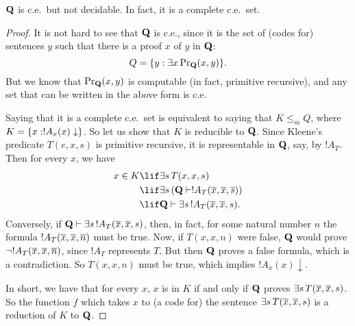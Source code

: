 \documentclass[../../include/open-logic-section]{subfiles}
\begin{document}



\begin{thm}
  $\mathbf{Q}$ is c.e.\ but not decidable. In fact, it is a complete c.e.\ set.
\end{thm}

\begin{proof}
It is not hard to see that $\mathbf{Q}$ is c.e., since it is the set of
(codes for) sentences $y$ such that there is a proof $x$ of $y$ in
$\mathbf{Q}$:
\[
Q = \Setabs{y}{\lexists[x][\fn{Pr}_\Th{Q}(x,y)]}.
\]
But we know that $\mathrm{Pr}_{\mathbf{Q}}(x,y)$ is computable (in fact, primitive
recursive), and any set that can be written in the above form is c.e.

Saying that it is a complete c.e.\ set is equivalent to saying that $K
\leq_m Q$, where $K = \{ x : !A_x(x) \downarrow \}$. So let us show
that $K$ is reducible to $\mathbf{Q}$. Since Kleene's predicate $T(e,x,s)$ is
primitive recursive, it is representable in $\mathbf{Q}$, say, by $!A_T$. Then
for every $x$, we have
\begin{align*}
x \in K & \lif \lexists[s][T(x,x,s)] \\
& \lif \lexists[s][(\Th{Q} \Proves !A_T(\num x,\num x, \num s))]
  \\
& \lif \Th{Q} \Proves \lexists[s][!A_T(\num x, \num x, s)].
\end{align*}
Conversely, if $\Th{Q} \Proves \lexists[s][!A_T(\num x, \num x, s)]$,
then, in fact, for some natural number $n$ the formula $!A_T(\overline{x},
\overline{x}, \overline{n})$ must be true.  Now, if $T(x,x,n)$ were false,
$\mathbf{Q}$ would prove $\lnot !A_T(\overline{x}, \overline{x}, \overline{n})$, since
$!A_T$ represents $T$.  But then $\mathbf{Q}$ proves a false formula,
which is a contradiction. So $T(x,x,n)$ must be true, which implies
$!A_x(x) \downarrow$.

In short, we have that for every $x$, $x$ is in $K$ if and only if
$\mathbf{Q}$ proves $\lexists[s][T(\num x,\num x,s)]$. So the function $f$
which takes $x$ to (a code for) the sentence $\lexists[s][T(\num x,
  \num x, s)]$ is a reduction of $K$ to $\mathbf{Q}$.
\end{proof}
\end{document}
